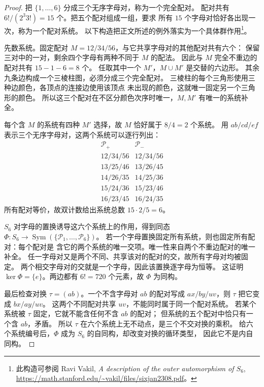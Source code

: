 \begin{proof}
把 $\{1,\dots,6\}$ 分成三个无序字母对，称为一个完全配对。
配对共有 $6!/(2^3 3!)=15$ 个。把五个配对组成一组，要求
所有 $15$ 个字母对恰好各出现一次，称为一个配对系统。
以下构造把正文所述的例外落实为一个具体群作用\footnote{此构造可参阅
Ravi Vakil, \emph{A description of the outer automorphism of $S_6$},
\url{https://math.stanford.edu/~vakil/files/sixjan2308.pdf}。}。

先数系统。固定配对 $M=12/34/56$，与它共享字母对的其他配对共有六个：
保留三对中的一对，剩余四个字母有两种不同于 $M$ 的配法。
因此与 $M$ 完全不重边的配对共有 $15-1-6=8$ 个。
任取其中一个 $M'$，$M\cup M'$ 是交替的六边形。
其余九条边构成一个三棱柱图，必须分成三个完全配对。
三棱柱的每个三角形使用三种边颜色，各顶点的连接边使用该顶点
未出现的颜色，这就唯一固定另一个三角形的颜色。
所以这三个配对在不区分颜色次序时唯一，$M,M'$ 有唯一的系统补全。

每个含 $M$ 的系统有四种 $M'$ 选择，故 $M$ 恰好属于 $8/4=2$ 个系统。
用 $ab/cd/ef$ 表示三个无序字母对，这两个系统可以逐行列出：
\[
\begin{array}{c|c}
\mathcal P_+&\mathcal P_-\\\hline
12/34/56&12/34/56\\
13/25/46&13/26/45\\
14/26/35&14/25/36\\
15/24/36&15/23/46\\
16/23/45&16/24/35
\end{array}
\]
所有配对等价，故双计数给出系统总数 $15\cdot2/5=6$。

$S_6$ 对字母的置换诱导这六个系统上的作用，得到同态
$\Phi:S_6\to\operatorname{Sym}(\{\mathcal P_1,\dots,\mathcal P_6\})$。
若一个字母置换固定所有系统，则也固定所有配对：每个配对是
含它的两个系统的唯一交项。唯一性来自两个不重边配对的唯一补全。
任一字母对又是两个不同、共享该对的配对的交，故所有字母对均被固定。
两个相交字母对的交就是一个字母，因此该置换逐字母为恒等。
这证明 $\ker\Phi=\{e\}$。两边都有 $6!=720$ 个元素，故 $\Phi$ 为同构。

最后检查对换 $\tau=(ab)$。一个不含字母对 $ab$ 的配对写成
$ax/by/uv$，则 $\tau$ 把它变成 $bx/ay/uv$。
这两个不同配对共享 $uv$，不能同时属于同一个配对系统。
若某个系统被 $\tau$ 固定，它就不能含任何不含 $ab$ 的配对；
但系统的五个配对中恰只有一个含 $ab$，矛盾。
所以 $\tau$ 在六个系统上无不动点，是三个不交对换的乘积。
给六个系统编号后，$\Phi$ 成为 $S_6$ 的自同构，却改变对换的循环类型，
因此它不是内自同构。
\end{proof}

